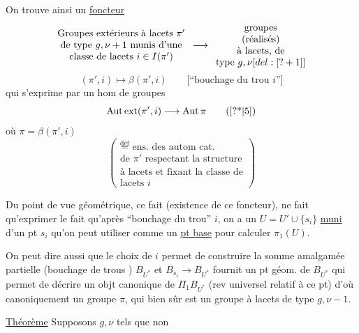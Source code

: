 On trouve ainsi un \uline{foncteur}
\[
\begin{array}{c}
\text{Groupes extérieurs à lacets }\pi'\\
\text{de type }g,\nu+1\text{ munis d'une}\\
\text{classe de lacets }i\in I(\pi')
\end{array}
\longrightarrow
\begin{array}{c}
\text{groupes}\\
\text{(réalisés)}\\
\text{à lacets, de}\\
\text{type }g,\nu[del: [?+1]]
\end{array}
\]
\[
(\pi',i)\longmapsto\beta(\pi',i)
\qquad
\text{[``bouchage du trou \(i\)'']}
\]
qui s'exprime par un hom de groupes
\[
\operatorname{Aut\,ext}(\pi',i)\longrightarrow\operatorname{Aut}\pi
\tag{\unsure{*|5}}
\]
où \(\pi=\beta(\pi',i)\)
\[
\left(
\begin{array}{l}
\overset{\text{déf}}{=}\text{ ens. des autom cat.}\\
\text{de }\pi'\text{ respectant la structure}\\
\text{à lacets et fixant la classe de}\\
\text{lacets }i
\end{array}
\right)
\]


Du point de vue géométrique, ce fait (existence de ce foncteur), ne fait qu'exprimer le fait qu'après ``bouchage du trou'' \(i\), on a un  \(U=U'\cup\{s_i\}\) \uline{muni} d'un pt \(s_i\) qu'on peut utiliser comme un \uline{pt base}  pour calculer \(\pi_1(U)\).

On peut dire aussi que le choix de \(i\) permet de construire la somme amalgamée partielle (bouchage de trous ) \(B_{U^*}\)
et \(B_{s_i}\longrightarrow B_{U^*}\) fournit un pt géom. de \(B_{U^*}\) qui permet de décrire un objt canonique de \(\Pi_1B_{U^*}\) (rev universel relatif à ce pt) d'où canoniquement un groupe \(\pi\), qui bien sûr est un groupe à lacets de type \(g,\nu-1\).

\uline{Théorème} Supposons \(g,\nu\) tels que non


